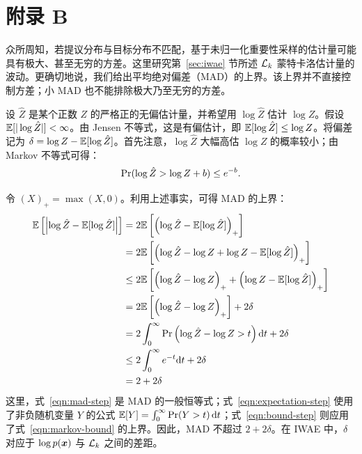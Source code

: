 \clearpage\section*{附录 B}
\label{app:is_variance}

众所周知，若提议分布与目标分布不匹配，基于未归一化重要性采样的估计量可能具有极大、甚至无穷的方差。这里研究第~\ref{sec:iwae} 节所述 $\mathcal{L}_{k}$ 蒙特卡洛估计量的波动。更确切地说，我们给出平均绝对偏差（MAD）的上界。该上界并不直接控制方差；小 MAD 也不能排除极大乃至无穷的方差。

设 $\hat Z$ 是某个正数 $Z$ 的严格正的无偏估计量，并希望用 $\log\hat Z$ 估计 $\log Z$。假设 $\mathbb{E}[|\log\hat Z|]<\infty$。由 Jensen 不等式，这是有偏估计，即 $\mathbb{E}[\log\hat Z]\leq\log Z$。将偏差记为 $\delta=\log Z-\mathbb{E}[\log\hat Z]$。首先注意，$\log\hat Z$ 大幅高估 $\log Z$ 的概率较小；由 Markov 不等式可得：
\begin{equation}
{\rm Pr}(\log \hat{Z} > \log Z + b) \leq e^{-b}. \label{eqn:markov-bound}
\end{equation}

令 $(X)_+=\max(X,0)$。利用上述事实，可得 MAD 的上界：
\begin{align}
\mathbb{E} \left[ \left|\log \hat{Z} - \mathbb{E}[\log \hat{Z}] \right| \right]
&= 2 \mathbb{E} \left[ \left(\log \hat{Z} - \mathbb{E}[\log \hat{Z}] \right)_+ \right] \label{eqn:mad-step}
\\
&= 2 \mathbb{E} \left[ \left(\log \hat{Z} - \log Z + \log Z - \mathbb{E}[\log \hat{Z}] \right)_+ \right]\label{eq:source-23}
\\
&\leq 2 \mathbb{E} \left[ \left(\log \hat{Z} - \log Z \right)_+ + \left( \log Z - \mathbb{E}[\log \hat{Z}] \right)_+ \right]\label{eq:source-24}
\\
&= 2 \mathbb{E} \left[ \left(\log \hat{Z} - \log Z \right)_+ \right] + 2 \delta\label{eq:source-25}
\\
&= 2 \int_0^\infty {\rm Pr} \left( \log \hat{Z} - \log Z > t \right) \mathrm{d}t + 2 \delta \label{eqn:expectation-step}
\\
&\leq 2 \int_0^\infty e^{-t} \mathrm{d}t + 2 \delta \label{eqn:bound-step}
\\
&= 2 + 2 \delta\label{eq:source-28}
\end{align}
这里，式~\eqref{eqn:mad-step} 是 MAD 的一般恒等式；式~\eqref{eqn:expectation-step} 使用了非负随机变量 $Y$ 的公式 $\mathbb{E}[Y]=\int_0^\infty\mathrm{Pr}(Y>t)\,\mathrm{d}t$；式~\eqref{eqn:bound-step} 则应用了式~\eqref{eqn:markov-bound} 的上界。因此，MAD 不超过 $2+2\delta$。在 IWAE 中，$\delta$ 对应于 $\log p(\bm{x})$ 与 $\mathcal{L}_{k}$ 之间的差距。

